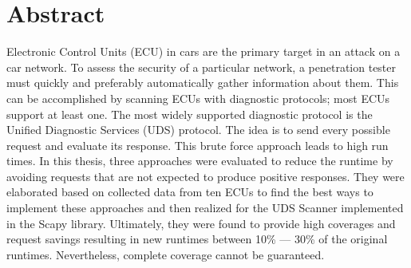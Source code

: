 \chapter*{\centering Abstract}

Electronic Control Units (ECU) in cars are the primary target in an attack on a car network. To assess the security of a particular network, a penetration tester must quickly and preferably automatically gather information about them. This can be accomplished by scanning ECUs with diagnostic protocols; most ECUs support at least one. The most widely supported diagnostic protocol is the Unified Diagnostic Services (UDS) protocol. The idea is to send every possible request and evaluate its response. This brute force approach leads to high run times. In this thesis, three approaches were evaluated to reduce the runtime by avoiding requests that are not expected to produce positive responses. They were elaborated based on collected data from ten ECUs to find the best ways to implement these approaches and then realized for the UDS Scanner implemented in the Scapy library. Ultimately, they were found to provide high coverages and request savings resulting in new runtimes between 10\% — 30\% of the original runtimes. Nevertheless, complete coverage cannot be guaranteed.
